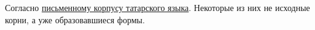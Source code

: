 Согласно \hyperlink{https://www.corpus.tatar/stat/tatcorpus2.lemmas_frequency_v.txt}{письменному корпусу татарского языка}. Некоторые из них не исходные корни, а уже образовавшиеся формы.